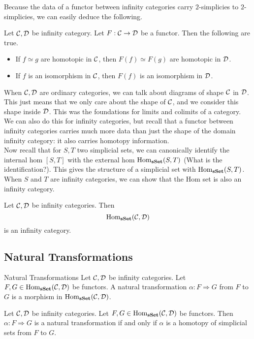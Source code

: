 \documentclass[a4paper]{article}
\begin{document}
Because the data of a functor between infinity categories carry $2$-simplicies to $2$-simplicies, we can easily deduce the following. 

\begin{lmm}{}{} Let $\mathcal{C},\mathcal{D}$ be infinity category. Let $F:\mathcal{C}\to\mathcal{D}$ be a functor. Then the following are true. 
\begin{itemize}
\item If $f\simeq g$ are homotopic in $\mathcal{C}$, then $F(f)\simeq F(g)$ are homotopic in $\mathcal{D}$. 
\item If $f$ is an isomorphism in $\mathcal{C}$, then $F(f)$ is an isomorphism in $\mathcal{D}$. 
\end{itemize}
\end{lmm}

When $\mathcal{C},\mathcal{D}$ are ordinary categories, we can talk about diagrams of shape $\mathcal{C}$ in $\mathcal{D}$. This just means that we only care about the shape of $\mathcal{C}$, and we consider this shape inside $\mathcal{D}$. This was the foundations for limits and colimits of a category. We can also do this for infinity categories, but recall that a functor between infinity categories carries much more data than just the shape of the domain infinity category: it also carries homotopy information. \\

Now recall that for $S,T$ two simplicial sets, we can canonically identify the internal hom $[S,T]$ with the external hom $\operatorname{Hom}_\bold{sSet}(S,T)$ (What is the identification?). This gives the structure of a simplicial set with $\operatorname{Hom}_\bold{sSet}(S,T)$. When $S$ and $T$ are infinity categories, we can show that the Hom set is also an infinity category. 

\begin{prp}{}{} Let $\mathcal{C},\mathcal{D}$ be infinity categories. Then $$\text{Hom}_\bold{sSet}(\mathcal{C},\mathcal{D})$$ is an infinity category. 
\end{prp}

\subsection{Natural Transformations}
\begin{defn}{Natural Transformations}{} Let $\mathcal{C},\mathcal{D}$ be infinity categories. Let $F,G\in\operatorname{Hom}_\bold{sSet}(\mathcal{C},\mathcal{D})$ be functors. A natural transformation $\alpha:F\Rightarrow G$ from $F$ to $G$ is a morphism in $\operatorname{Hom}_\bold{sSet}(\mathcal{C},\mathcal{D})$. 
\end{defn}

\begin{prp}{}{} Let $\mathcal{C},\mathcal{D}$ be infinity categories. Let $F,G\in\operatorname{Hom}_\bold{sSet}(\mathcal{C},\mathcal{D})$ be functors. Then $\alpha:F\Rightarrow G$ is a natural transformation if and only if $\alpha$ is a homotopy of simplicial sets from $F$ to $G$. 
\end{prp}
\end{document}
